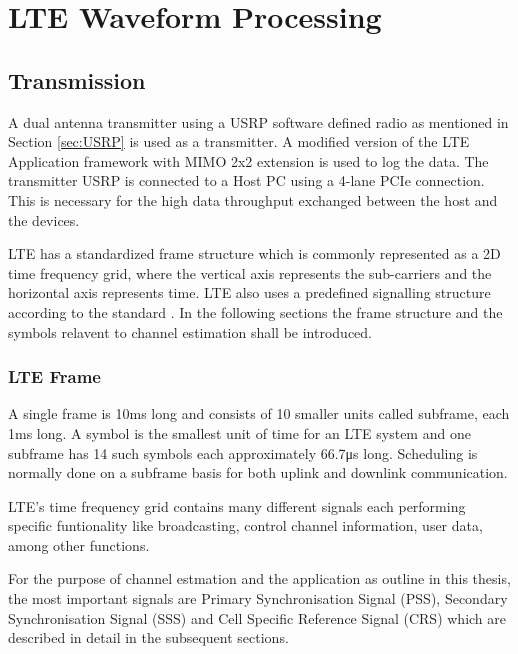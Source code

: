 \section{LTE Waveform Processing}\label{sec:LTE Waveform Processing}

\subsection{Transmission} \label{ssec:Transmission}

A dual antenna transmitter using a USRP software defined radio as mentioned in Section \ref{sec:USRP} is used as a transmitter. A modified version of the LTE Application framework with MIMO 2x2 extension is used to log the data. The transmitter USRP is connected to a Host PC using a 4-lane PCIe connection. This is necessary for the high data throughput exchanged between the host and the devices.

LTE has a standardized frame structure which is commonly represented as a 2D time frequency grid, where the vertical axis represents the sub-carriers and the horizontal axis represents time. LTE also uses a predefined signalling structure according to the standard \cite{3gpp36211}. In the following sections the frame structure and the symbols relavent to channel estimation shall be introduced.

\subsubsection{LTE Frame} \label{LTEFrame}

A single frame is 10\si{\milli\second} long and consists of 10 smaller units called subframe, each 1\si{\milli\second} long. A symbol is the smallest unit of time for an LTE system and one subframe has 14 such symbols each approximately 66.7\si{\micro\second} long. Scheduling is normally done on a subframe basis for both uplink and downlink communication.

LTE's time frequency grid contains many different signals each performing specific funtionality like broadcasting, control channel information, user data, among other functions.

For the purpose of channel estmation and the application as outline in this thesis, the most important signals are Primary Synchronisation Signal (PSS), Secondary Synchronisation Signal (SSS) and Cell Specific Reference Signal (CRS) which are described in detail in the subsequent sections.

